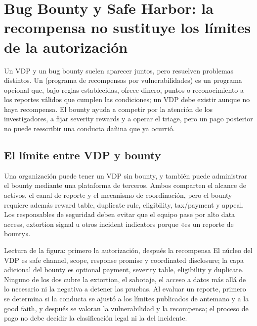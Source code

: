 \section{Bug Bounty y Safe Harbor: la recompensa no sustituye los límites de la autorización}

Un VDP y un bug bounty suelen aparecer juntos, pero resuelven problemas distintos. Un  (programa de recompensas por vulnerabilidades) es un programa opcional que, bajo reglas establecidas, ofrece dinero, puntos o reconocimiento a los reportes válidos que cumplen las condiciones; un VDP debe existir aunque no haya recompensa. El bounty ayuda a competir por la atención de los investigadores, a fijar severity rewards y a operar el triage, pero un pago posterior no puede reescribir una conducta dañina que ya ocurrió.

\subsection{El límite entre VDP y bounty}

Una organización puede tener un VDP sin bounty, y también puede administrar el bounty mediante una plataforma de terceros. Ambos comparten el alcance de activos, el canal de reporte y el mecanismo de coordinación, pero el bounty requiere además reward table, duplicate rule, eligibility, tax/payment y appeal. Los responsables de seguridad deben evitar que el equipo pase por alto data access, extortion signal u otros incident indicators porque «es un reporte de bounty».


\begin{knowledgebox}{Lectura de la figura: primero la autorización, después la recompensa}
El núcleo del VDP es safe channel, scope, response promise y coordinated disclosure; la capa adicional del bounty es optional payment, severity table, eligibility y duplicate. Ninguno de los dos cubre la extortion, el sabotaje, el acceso a datos más allá de lo necesario ni la negativa a detener las pruebas. Al evaluar un reporte, primero se determina si la conducta se ajustó a los límites publicados de antemano y a la good faith, y después se valoran la vulnerabilidad y la recompensa; el proceso de pago no debe decidir la clasificación legal ni la del incidente.
\end{knowledgebox}


